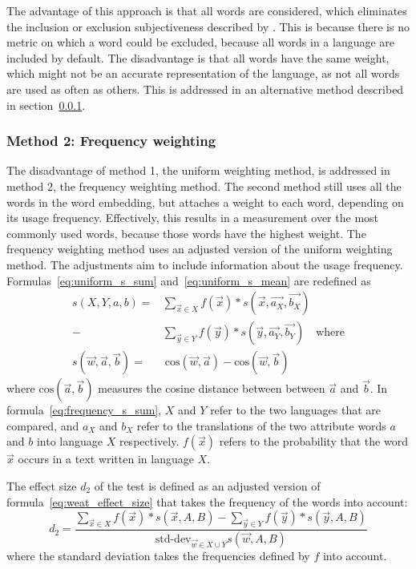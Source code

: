 The advantage of this approach is
that all words are considered, which eliminates the inclusion or exclusion subjectiveness
described by \textcite{nissim_fair_is_better_2020}.  This is because there is no metric
on which a word could be excluded, because all words in a language are included by default.
The disadvantage is that all words have the same weight, which might not be an accurate
representation of the language, as not all words are used as often as others. This is
addressed in an alternative method described in section~\ref{method:2}.

\subsubsection{Method 2: Frequency weighting}
\label{method:2}
The disadvantage of method 1, the uniform weighting method, is addressed in method 2,
the frequency weighting method.
The second method still uses all the words in the word embedding, but attaches a
weight to
each word, depending on its usage frequency. Effectively, this results in a measurement
over the most commonly used words, because those words have the highest weight.
The frequency weighting method uses an adjusted version of the uniform weighting method.
The adjustments aim to include information about the usage frequency.
Formulas~\eqref{eq:uniform_s_sum} and~\eqref{eq:uniform_s_mean} are redefined
as
\begin{align} \label{eq:frequency_s_sum}
    s(X,Y,a,b) =& \displaystyle\sum_{\vec{x} \in X}\! f(\vec{x})*s(\vec{x},\vec{a_X},\vec{b_X})
    \nonumber \\
    -& \displaystyle\sum_{\vec{y} \in Y}\! f(\vec{y})\! *\! s(\vec{y},\vec{a_Y},\vec{b_Y})
    \quad\text{where} \\
\label{eq:frequency_s_mean}
s(\vec{w},\vec{a},\vec{b}) =&\ \text{cos}(\vec{w}, \vec{a}) - \text{cos}(\vec{w}, \vec{b})
\end{align}
where $\text{cos}(\vec{a}, \vec{b})$ measures the cosine distance between between
$\vec{a}$ and $\vec{b}$. 
In formula~\eqref{eq:frequency_s_sum}, $X$ and $Y$ refer to the two languages that are
compared, and $a_X$ and $b_X$ refer to the translations of the
two attribute words $a$ and $b$ into language $X$ respectively. 
$f(\vec{x})$ refers to the probability that the word $\vec{x}$ occurs in a text written
in language $X$.

The effect size $d_2$ of the test is defined as an adjusted version of
formula~\eqref{eq:weat_effect_size} that takes the frequency of the words into account:
\begin{equation}\label{eq:frequency_effect_size}
d_2\! =\! \frac{
    \displaystyle\sum_{\vec{x} \in X}\! f(\vec{x})\! *\! s(\vec{x}, A, B)\! -\! \sum_{\vec{y} \in Y}\! f(\vec{y}) * s(\vec{y}, A, B)
}{
\text{std-dev}_{\vec{w} \in X \cup Y} s(\vec{w},A,B)
}
\end{equation}
where the standard deviation takes the frequencies defined by $f$ into account.


